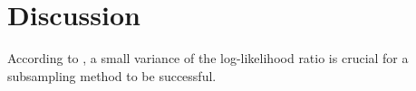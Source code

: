 \chapter{Discussion}
According to \cite{quiroz2019speeding}, a small variance of the log-likelihood ratio is crucial for a subsampling method to be successful.  